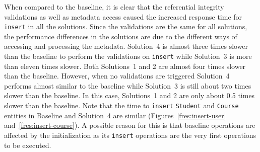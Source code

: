 When compared to the baseline, it is clear that the referential integrity
validations as well as metadata access caused the increased response time for
\texttt{insert} in all the solutions. Since the validations are the same for all
solutions, the performance differences in the solutions are due to the different
ways of accessing and processing the metadata.
Solution~4 is almost three times slower than the baseline to perform the
validations on \texttt{insert} while Solution~3 is more than eleven times
slower. Both Solutions~1 and 2 are almost four times slower than the baseline.
However, when no validations are triggered Solution~4 performs almost similar to
the baseline while Solution~3 is still about two times slower than the baseline.
In this case, Solutions~1 and 2 are only about 0.5 times slower than the
baseline. Note that the time to \texttt{insert} \texttt{Student} and
\texttt{Course} entities in Baseline and Solution~4 are similar (Figures~\ref{fres:insert-user}
and~\ref{fres:insert-course}). A possible reason for this is that baseline
operations are affected by the initialization as its \texttt{insert} operations
are the very first operations to be executed.

